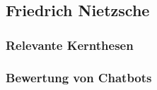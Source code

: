 \subsection{Friedrich Nietzsche}

\subsubsection{Relevante Kernthesen}


\subsubsection{Bewertung von Chatbots}
